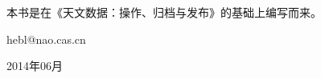 \vspace*{0.0cm}
\thispagestyle{empty}
\vspace*{2.2cm}
\centerline{\huge\hei{\color{mblue}{前~言}}}\vspace{2cm}

本书是在《天文数据：操作、归档与发布》的基础上编写而来。

\vspace{2cm}

\hfill {\large\guli{\color{darkblue}{何勃亮}}}\hspace{0.2em}

\hfill hebl@nao.cas.cn\hspace{0.2em}

\hfill 2014年06月\hspace{0.2em}
